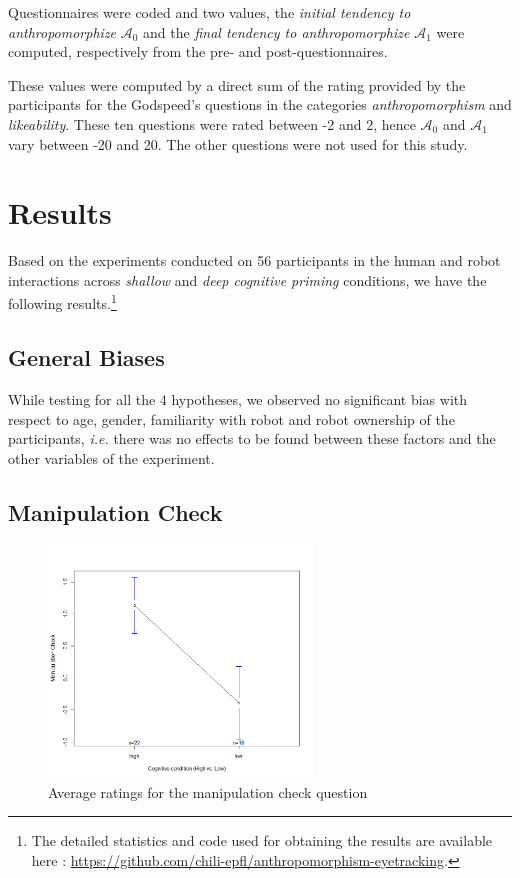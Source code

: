 \documentclass[lettersize, noapacite, twoside, HRI]{apa_HRI}
\newcommand{\ie}{\textit{i.e.}\xspace}
\newcommand{\anti}{{$\mathcal{A}_0$\xspace}}
\newcommand{\antf}{{$\mathcal{A}_1$\xspace}}
\begin{document}
Questionnaires were coded and two values, the \emph{initial tendency to
anthropomorphize} \anti{} and the \emph{final tendency to anthropomorphize} \antf{}
were computed, respectively from the pre- and post-questionnaires.

These values were computed by a direct sum of the rating provided by the
participants for the Godspeed's questions in the categories
\emph{anthropomorphism} and \emph{likeability}. These ten questions were rated
between -2 and 2, hence \anti{} and \antf{} vary between -20 and 20. The other
questions were not used for this study.

\section{Results}

Based on the experiments conducted on 56 participants in the human and robot
interactions across \emph{shallow} and \emph{deep cognitive priming} conditions,
we have the following results.\footnote{The detailed statistics and code used
    for obtaining the results are available here :
\url{https://github.com/chili-epfl/anthropomorphism-eyetracking}.}

\subsection{General Biases}

While testing for all the 4 hypotheses, we observed no significant bias with
respect to age, gender, familiarity with robot and robot ownership
of the participants, \ie there was no effects to be found between these factors
and the other variables of the experiment.

\subsection{Manipulation Check}

\begin{figure}
    \centering
    \includegraphics[width=7cm]{ManipulationCheck}
    \caption{Average ratings for the manipulation check question}
    \label{fig:ManipulationCheck}
\end{figure}
\end{document}
